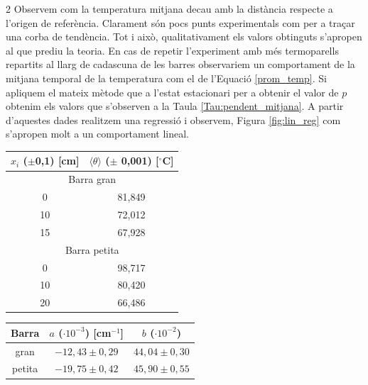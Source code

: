 \documentclass[12pt,twosides,onecolumn,openany]{article}
\newenvironment{Figura}
  {\par\medskip\noindent\minipage{\linewidth}}
  {\endminipage\par\medskip}
\begin{document}
\begin{multicols}{2}
Observem com la temperatura mitjana decau amb la distància respecte a l'origen de referència. Clarament són pocs punts experimentals com per a traçar una corba de tendència. Tot i això, qualitativament els valors obtinguts s'apropen al que prediu la teoria. En cas de repetir l'experiment amb més termoparells repartits al llarg de cadascuna de les barres observariem un comportament de la mitjana temporal de la temperatura com el de l'Equació \eqref{prom_temp}. Si apliquem el mateix mètode que a l'estat estacionari per a obtenir el valor de $p$ obtenim els valors que s'observen a la Taula \ref{Tau:pendent_mitjana}. A partir d'aquestes dades realitzem una regressió i observem, Figura \ref{fig:lin_reg} com s'apropen molt a un comportament lineal.
\begin{Figura}
  \centering
  \begin{tabular}{c|c}
    $x_i$ ($\pm$0,1) [cm] & $\langle \theta \rangle$ ($\pm$ 0,001) [$^\circ$C]\\
    \hline 
    \multicolumn{2}{c}{Barra gran} \\ \hline
    0 & 81,849\\
    10 & 72,012\\
    15 & 67,928 \\ \hline
    \multicolumn{2}{c}{Barra petita} \\ \hline
    0 & 98,717\\
    10 & 80,420\\
    20 & 66,486 \\
  \end{tabular}
  \label{Tau:mitjanes}
\end{Figura}
\begin{Figura}
  \centering
  \begin{tabular}{c|c|c}
    Barra & $a$ ($\cdot 10^{-3}$) [cm$^{-1}$] & $b$ ($\cdot 10^{-2}$) \\ \hline\hline
    gran & $-12,43\pm0,29$ & $44,04\pm0,30$\\
    petita & $-19,75\pm0,42$ & $45,90\pm0,55$
  \end{tabular}
  \label{Tau:pendent_mitjana}
\end{Figura}
\begin{Figura}
  \centering

\end{Figura}
\end{multicols}
\end{document}
